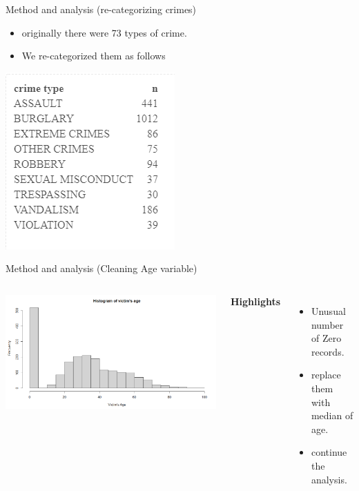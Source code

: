 \documentclass{beamer}\usepackage[]{graphicx}\usepackage[]{xcolor}
\makeatletter
\def\maxwidth{ %
  \ifdim\Gin@nat@width>\linewidth
    \linewidth
  \else
    \Gin@nat@width
  \fi
}
\newenvironment{knitrout}{}{} %
\makeatother
\begin{document}
\begin{frame}[fragile]{Method and analysis (re-categorizing crimes)}
\begin{itemize}
\item originally there were 73 types of crime.
\item We re-categorized them as follows
\end{itemize}

\begin{knitrout}
\color{fgcolor}
\includegraphics[width=\maxwidth]{figure/crime_types.png} 
\end{knitrout}

\end{frame}

\begin{frame}[fragile]{Method and analysis (Cleaning Age variable)}
\begin{columns}
\begin{knitrout}
\color{fgcolor}
\includegraphics[width=\maxwidth]{figure/hist_age.png} 
\end{knitrout}

\textbf{Highlights}
\begin{itemize}
\item Unusual number of Zero records.
\item replace them with median of age. 
\item continue the analysis.

\end{itemize}

\end{columns}
\end{frame}
\end{document}
